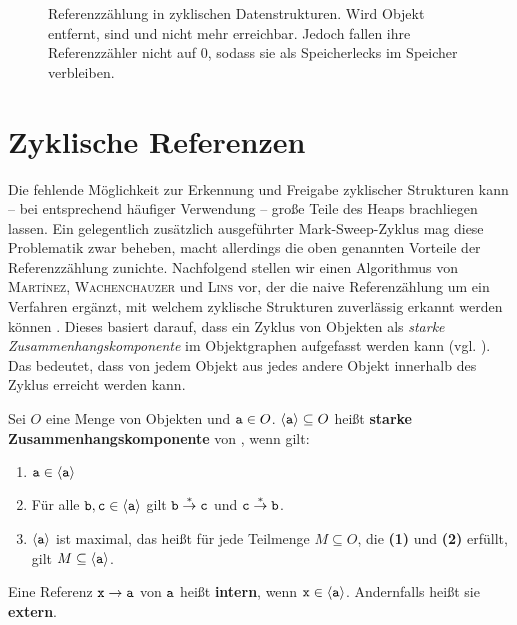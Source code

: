\begin{figure}[h]
	\centering
	
	\caption[Referenzzählung in zyklischen Datenstrukturen]{Referenzzählung in zyklischen Datenstrukturen. Wird Objekt  entfernt, sind  und  nicht mehr erreichbar. Jedoch fallen ihre Referenzzähler nicht auf $0$, sodass sie als Speicherlecks im Speicher verbleiben.}
	\label{fig:rc-cycle}
\end{figure}




\section{Zyklische Referenzen}
\label{sec:cyclic-rc}
Die fehlende Möglichkeit zur Erkennung und Freigabe zyklischer Strukturen kann -- bei entsprechend häufiger Verwendung -- große Teile des Heaps brachliegen lassen.
Ein gelegentlich zusätzlich ausgeführter Mark-Sweep-Zyklus mag diese Problematik zwar beheben, macht allerdings die oben genannten Vorteile der Referenzzählung zunichte.
Nachfolgend stellen wir einen Algorithmus von \textsc{Martínez}, \textsc{Wachenchauzer} und \textsc{Lins} vor, der die naive Referenzählung um ein Verfahren ergänzt, mit welchem zyklische Strukturen zuverlässig erkannt werden können \cite{martinez1990}.
Dieses basiert darauf, dass ein Zyklus von Objekten als \textit{starke Zusammenhangskomponente} im Objektgraphen aufgefasst werden kann (vgl. \cite[S. 348]{linhou2006}).
Das bedeutet, dass von jedem Objekt aus jedes andere Objekt innerhalb des Zyklus erreicht werden kann.

\begin{mybox}
\begin{defn}
\label{def:zusammenhang}
	Sei $O$ eine Menge von Objekten und $\texttt{a} \in O$.
	$\left\langle\texttt{a}\right\rangle \subseteq O$ heißt \textbf{starke Zusammenhangskomponente} von , wenn gilt:
	\begin{enumerate}[(1)]
		\item $\texttt{a} \in \left\langle\texttt{a}\right\rangle$
		\item Für alle $\texttt{b}, \texttt{c} \in \left\langle\texttt{a}\right\rangle$ gilt $\texttt{b} \overset{*}{\rightarrow} \texttt{c}$ und $\texttt{c} \overset{*}{\rightarrow} \texttt{b}$.
		\item $\left\langle\texttt{a}\right\rangle$ ist maximal, das heißt für jede Teilmenge $M \subseteq O$, die \textbf{(1)} und \textbf{(2)} erfüllt, gilt $M \subseteq \left\langle\texttt{a}\right\rangle$.
	\end{enumerate}
	Eine Referenz $\texttt{x} \rightarrow \texttt{a}$ von $\texttt{a}$ heißt \textbf{intern}, wenn $\texttt{x} \in \left\langle\texttt{a}\right\rangle$.
	Andernfalls heißt sie \textbf{extern}.	
\end{defn}
\end{mybox}


